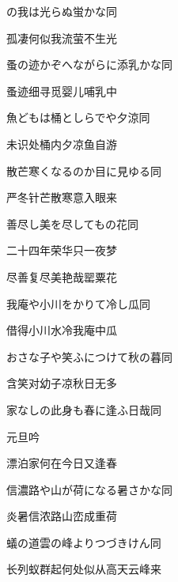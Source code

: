 \begin{haiku}
    {\FH {}の我は光らぬ蛍かな}\hfill{\FH 同}

    {\FK 孤凄何似我流萤不生光}
\end{haiku}

\begin{haiku}
    {\FH 蚤の迹かぞへながらに添乳かな}\hfill{\FH 同}

    {\FK 蚤迹细寻觅婴儿哺乳中}
\end{haiku}

\begin{haiku}
    {\FH 魚どもは桶としらでや夕涼}\hfill{\FH 同}

    {\FK 未识处桶内夕凉鱼自游}
\end{haiku}

\begin{haiku}
    {\FH 散芒寒くなるのか目に見ゆる}\hfill{\FH 同}

    {\FK 严冬针芒散寒意入眼来}
\end{haiku}

\begin{haiku}
    {\FH 善尽し美を尽してもの花}\hfill{\FH 同}

    {\FK 二十四年荣华只一夜梦}

    {\FK 尽善复尽美艳哉罂粟花}
\end{haiku}

\begin{haiku}
    {\FH 我庵や小川をかりて冷し瓜}\hfill{\FH 同}

    {\FK 借得小川水冷我庵中瓜}
\end{haiku}

\begin{haiku}
    {\FH おさな子や笑ふにつけて秋の暮}\hfill{\FH 同}

    {\FK 含笑对幼子凉秋日无多}
\end{haiku}

\begin{haiku}
    {\FH 家なしの此身も春に逢ふ日哉}\hfill{\FH 同}

    {\FK 元旦吟}

    {\FK 漂泊家何在今日又逢春}
\end{haiku}

\begin{haiku}
    {\FH 信濃路や山が荷になる暑さかな}\hfill{\FH 同}

    {\FK 炎暑信浓路山峦成重荷}
\end{haiku}

\begin{haiku}
    {\FH 蟻の道雲の峰よりつづきけん}\hfill{\FH 同}

    {\FK 长列蚁群起何处似从高天云峰来}
\end{haiku}


